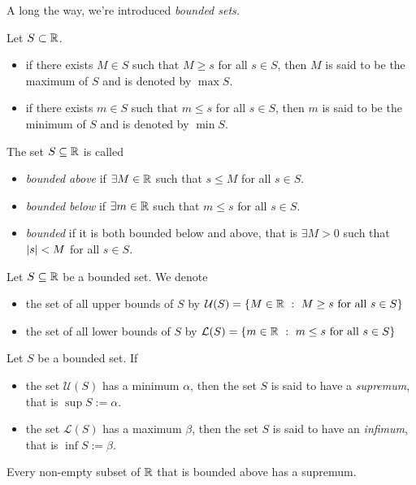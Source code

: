 A long the way, we're introduced \emph{bounded sets.}
\begin{definition}
  Let $S\subset\mathbb{R}$.
  \begin{itemize}
    \item if there exists $M\in S$ such that 
      $M\geq s$ for all $s\in S$, then $M$ is said to be the
      maximum of $S$ and is denoted by $\max S$.
    \item if there exists $m\in S$ such that 
      $m\leq s$ for all $s\in S$, then $m$ is said to be the
      minimum of $S$ and is denoted by $\min S$.
  \end{itemize}
\end{definition}
\begin{definition}
  The set $S\subseteq\mathbb{R}$ is called
  \begin{itemize}
    \item \emph{bounded above} if $\exists M\in\mathbb{R}$ such that 
      $s\leq M$ for all $s\in S$.
    \item \emph{bounded below} if $\exists m\in\mathbb{R}$  such that
      $m\leq s$ for all $s\in S$.
    \item \emph{bounded} if it is both bounded below and above, 
      that is $\exists M>0$ such that $\lvert s\rvert<M$ for all $s\in S$.
  \end{itemize}
\end{definition}
\begin{definition}
  Let $S\subseteq\mathbb{R}$ be a bounded set. We denote
  \begin{itemize}
    \item the set of all upper bounds of $S$ by 
      $\mathcal{U}(S)=\left\{M\in\mathbb{R} ~:~ M\geq s \text{ for all }s\in S\right\}$
    \item the set of all lower bounds of $S$ by
      $\mathcal{L}(S)=\left\{m\in\mathbb{R} ~:~ m\leq s\text{ for all }s\in S\right\}$
  \end{itemize}
\end{definition}
\begin{definition}
  Let $S$ be a bounded set. If
  \begin{itemize}
    \item the set $\mathcal{U}(S)$ has a minimum $\alpha$, then the set
      $S$ is said to have a \emph{supremum}, that is
      $\sup S:=\alpha$.
    \item the set $\mathcal{L}(S)$ has a maximum $\beta$,
      then the set $S$ is said to have an \emph{infimum}, that is
      $\inf S:=\beta$.
  \end{itemize}
\end{definition}
\begin{axiom}
  Every non-empty subset of $\mathbb{R}$ that is bounded above 
  has a supremum.
\end{axiom}







